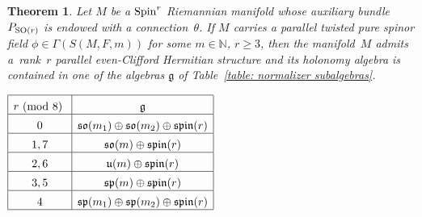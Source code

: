 \documentclass[pdftex]{sigma}
\numberwithin{equation}{section}
\newtheorem{Theorem}{Theorem}[section]
\begin{document}
\begin{Theorem}\label{theo: parallelness} Let $M$ be a ${\rm Spin}^r$ Riemannian manifold whose auxiliary bundle $P_{{\rm SO}(r)}$ is endowed with a connection~$\theta$. If $M$ carries a parallel twisted pure spinor field $\phi\in\Gamma(S(M,F,m))$ for some $m\in\mathbb{N}$, $r\geq 3$, then the manifold~$M$ admits a~rank~$r$ parallel even-Clifford Hermitian structure and its holonomy algebra is contained in one of the algebras $\mathfrak{g}$ of Table~{\rm \ref{table: normalizer subalgebras}}.
\begin{table}[h!]\centering
$
\begin{array}{|c|c|}
 \hline
 r \mbox{\ {\rm (mod 8)} } & \mathfrak{g}
 \rule{0pt}{3ex}
 \\
 \hline
 0 & \mathfrak{so}(m_1)\oplus\mathfrak{so}(m_2)\oplus {\mathfrak{spin}}(r)\rule{0pt}{3ex}\\
 \hline
 1,7 & \mathfrak{so}(m)\oplus {\mathfrak{spin}}(r)\rule{0pt}{3ex}\\
\hline
 2,6 & \mathfrak{u}(m)\oplus {\mathfrak{spin}}(r)\rule{0pt}{3ex}\\
\hline
 3,5 & \mathfrak{sp}(m)\oplus {\mathfrak{spin}}(r)\rule{0pt}{3ex}\\
\hline
 4 & \mathfrak{sp}(m_1)\oplus \mathfrak{sp}(m_2)\oplus {\mathfrak{spin}}(r)\rule{0pt}{3ex}\\
\hline
 \end{array}
$
\caption{}\label{table: normalizer subalgebras}
\end{table}
\end{Theorem}
\end{document}
